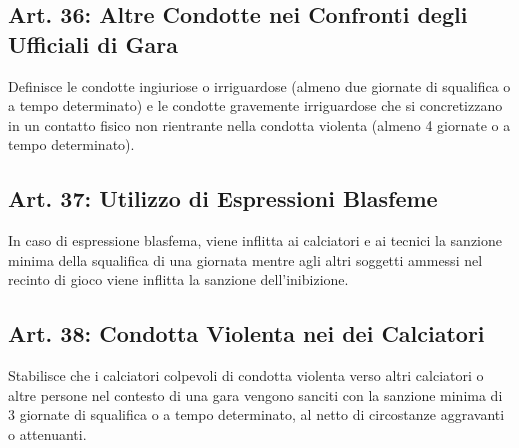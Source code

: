 \documentclass[../uefaC.tex]{subfiles}
\begin{document}
\subsection{Art. 36: Altre Condotte nei Confronti degli Ufficiali di Gara}
Definisce le condotte ingiuriose o irriguardose (almeno due giornate di squalifica o a tempo determinato) e le condotte gravemente irriguardose che si concretizzano in un contatto fisico non rientrante nella condotta violenta (almeno 4 giornate o a tempo determinato).

\subsection{Art. 37: Utilizzo di Espressioni Blasfeme}
In caso di espressione blasfema, viene inflitta ai calciatori e ai tecnici la sanzione minima della squalifica di una giornata mentre agli altri soggetti ammessi nel recinto di gioco viene inflitta la sanzione dell'inibizione.

\subsection{Art. 38: Condotta Violenta nei dei Calciatori}
Stabilisce che i calciatori colpevoli di condotta violenta verso altri calciatori o altre persone nel contesto di una gara vengono sanciti con la sanzione minima di 3 giornate di squalifica o a tempo determinato, al netto di circostanze aggravanti o attenuanti.
\end{document}
